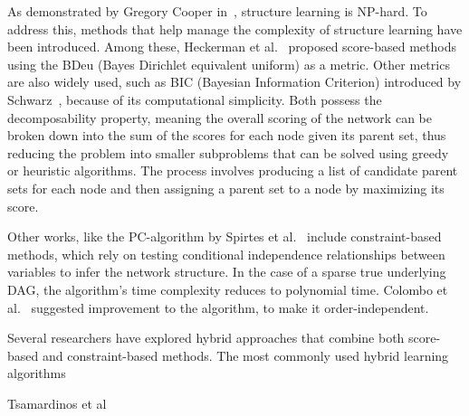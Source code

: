 As demonstrated by Gregory Cooper in~\cite{cooper1990complexity}, structure learning is NP-hard. To address this, methods that help manage the complexity of structure learning have been introduced. Among these, Heckerman et al.~\cite{heckerman1995learning} proposed score-based methods using the BDeu (Bayes Dirichlet equivalent uniform) as a metric. Other metrics are also widely used, such as BIC (Bayesian Information Criterion) introduced by Schwarz~\cite{schwarz1978estimating}, because of its computational simplicity. Both possess the decomposability property, meaning the overall scoring of the network can be broken down into the sum of the scores for each node given its parent set, thus reducing the problem into smaller subproblems that can be solved using greedy or heuristic algorithms. The process involves producing a list of candidate parent sets for each node and then assigning a parent set to a node by maximizing its score. 

Other works,  like the PC-algorithm by Spirtes et al.~\cite{spirtes1991algorithm} include constraint-based methods, which rely on testing conditional independence relationships between variables to infer the network structure. In the case of a sparse true underlying DAG, the algorithm's time complexity reduces to polynomial time. Colombo et al.~\cite{colombo2014order} suggested improvement to the algorithm, to make it order-independent. 

Several researchers have explored hybrid approaches that combine both score-based and constraint-based methods. The most commonly used hybrid learning algorithms

Tsamardinos et al~\cite{tsamardinos2006maxmin} 


